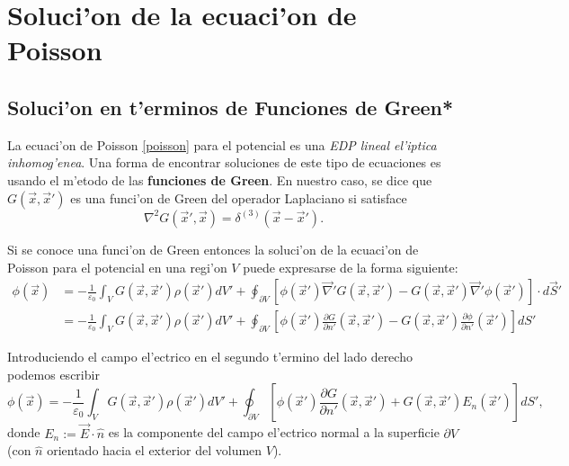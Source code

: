 

 \section{Soluci'on de la ecuaci'on de Poisson} 
 \subsection{Soluci'on en t'erminos de Funciones de Green*}\label{Green}
 La ecuaci'on de Poisson \eqref{poisson} para el potencial es una \textit{EDP lineal el'iptica inhomog'enea}. Una forma de encontrar soluciones de este tipo de ecuaciones es usando el m'etodo de las \textbf{funciones de Green}. En nuestro caso, se dice que $G(\vec{x},\vec{x}')$ es una funci'on de Green del operador Laplaciano si satisface
\begin{equation}\label{EDPG}
\nabla^2G(\vec{x}',\vec{x})=\delta^{(3)}(\vec{x}-\vec{x}').
\end{equation} 

Si se conoce una funci'on de Green entonces la soluci'on de la ecuaci'on de Poisson para el potencial en una regi'on $V$ puede expresarse de la forma siguiente:
\begin{align}
\phi(\vec{x}) &= -\frac{1}{\varepsilon_0}\int_VG(\vec{x},\vec{x}')\rho(\vec{x}')dV'+\oint_{\partial V}\left[\phi(\vec{x}')\vec\nabla' G(\vec{x},\vec{x}')-G(\vec{x},\vec{x}')\vec\nabla'\phi(\vec{x}')\right]\cdot d\vec{S}' \\
&=  -\frac{1}{\varepsilon_0}\int_VG(\vec{x},\vec{x}') \rho(\vec{x}')dV'+\oint_{\partial V}\left[\phi(\vec{x}')\frac{\partial G}{\partial n'}(\vec{x},\vec{x}')-G(\vec{x},\vec{x}')\frac{\partial\phi}{\partial n'}(\vec{x}')\right]dS'
\end{align}

Introduciendo el campo el'ectrico en el segundo t'ermino del lado derecho podemos escribir
\begin{equation}\label{solPoisson}
\phi(\vec{x})= -\frac{1}{\varepsilon_0}\int_VG(\vec{x},\vec{x}') \rho(\vec{x}')dV'+\oint_{\partial V}\left[\phi(\vec{x}')\frac{\partial G}{\partial n'}(\vec{x},\vec{x}')+G(\vec{x},\vec{x}')E_n(\vec{x}')\right]dS',
\end{equation}
donde $E_n:=\vec{E}\cdot\hat{n}$ es la componente del campo el'ectrico normal a la superficie $\partial V$ (con $\hat{n}$ orientado hacia el exterior del volumen $V$).

